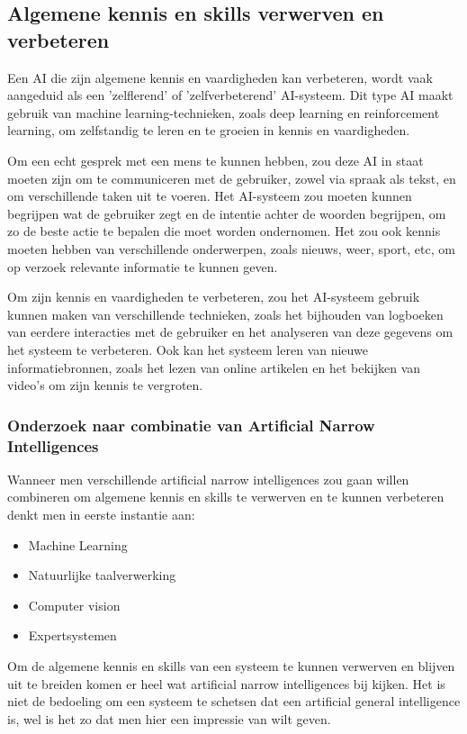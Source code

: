 \newpage

\subsection{Algemene kennis en skills verwerven en verbeteren}

Een AI die zijn algemene kennis en vaardigheden kan verbeteren, wordt vaak aangeduid als een 'zelflerend' of 'zelfverbeterend' AI-systeem. Dit type AI maakt gebruik van machine learning-technieken, zoals deep learning en reinforcement learning, om zelfstandig te leren en te groeien in kennis en vaardigheden.

Om een echt gesprek met een mens te kunnen hebben, zou deze AI in staat moeten zijn om te communiceren met de gebruiker, zowel via spraak als tekst, en om verschillende taken uit te voeren. Het AI-systeem zou moeten kunnen begrijpen wat de gebruiker zegt en de intentie achter de woorden begrijpen, om zo de beste actie te bepalen die moet worden ondernomen. Het zou ook kennis moeten hebben van verschillende onderwerpen, zoals nieuws, weer, sport, etc, om op verzoek relevante informatie te kunnen geven.

Om zijn kennis en vaardigheden te verbeteren, zou het AI-systeem gebruik kunnen maken van verschillende technieken, zoals het bijhouden van logboeken van eerdere interacties met de gebruiker en het analyseren van deze gegevens om het systeem te verbeteren. Ook kan het systeem leren van nieuwe informatiebronnen, zoals het lezen van online artikelen en het bekijken van video's om zijn kennis te vergroten.

\subsubsection{Onderzoek naar combinatie van Artificial Narrow Intelligences}

Wanneer men verschillende artificial narrow intelligences zou gaan willen combineren om algemene kennis en skills te verwerven en te kunnen verbeteren denkt men in eerste instantie aan:

\begin{itemize}
    \item Machine Learning
    \item Natuurlijke taalverwerking
    \item Computer vision
    \item Expertsystemen
\end{itemize}

Om de algemene kennis en skills van een systeem te kunnen verwerven en blijven uit te breiden komen er heel wat artificial narrow intelligences bij kijken. Het is niet de bedoeling om een systeem te schetsen dat een artificial general intelligence is, wel is het zo dat men hier een impressie van wilt geven.

